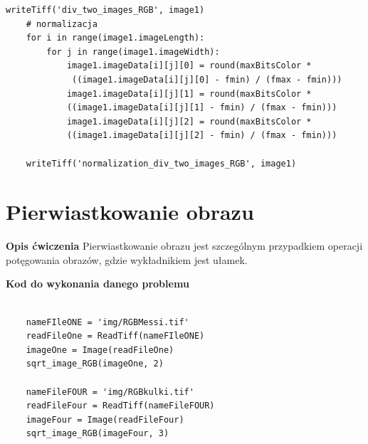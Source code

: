 \documentclass[magisterska,openany]{pracadypl}
\begin{document}
\begin{lstlisting}[caption={Dzielenie dwóch obrazów}]
    writeTiff('div_two_images_RGB', image1)
    # normalizacja
    for i in range(image1.imageLength):
        for j in range(image1.imageWidth):
            image1.imageData[i][j][0] = round(maxBitsColor *
             ((image1.imageData[i][j][0] - fmin) / (fmax - fmin)))
            image1.imageData[i][j][1] = round(maxBitsColor * 
            ((image1.imageData[i][j][1] - fmin) / (fmax - fmin)))
            image1.imageData[i][j][2] = round(maxBitsColor * 
            ((image1.imageData[i][j][2] - fmin) / (fmax - fmin)))

    writeTiff('normalization_div_two_images_RGB', image1)

\end{lstlisting}
\newpage


\section{Pierwiastkowanie obrazu}

\vspace{0.5cm}\textbf{\Large Opis ćwiczenia}
\vspace{0.25cm}\newline
Pierwiastkowanie obrazu jest szczególnym przypadkiem operacji potęgowania obrazów, gdzie wykładnikiem jest ułamek.
\newline
\newline

\vspace{0.5cm}
\textbf{\Large Kod do wykonania danego problemu}
\lstset{language=Python}
\vspace{0.25cm}
\begin{lstlisting}

	nameFIleONE = 'img/RGBMessi.tif'
	readFileOne = ReadTiff(nameFIleONE)
	imageOne = Image(readFileOne)
	sqrt_image_RGB(imageOne, 2)
	
	nameFileFOUR = 'img/RGBkulki.tif'
	readFileFour = ReadTiff(nameFileFOUR)
	imageFour = Image(readFileFour)
	sqrt_image_RGB(imageFour, 3)

\end{lstlisting}
\newpage
\end{document}
